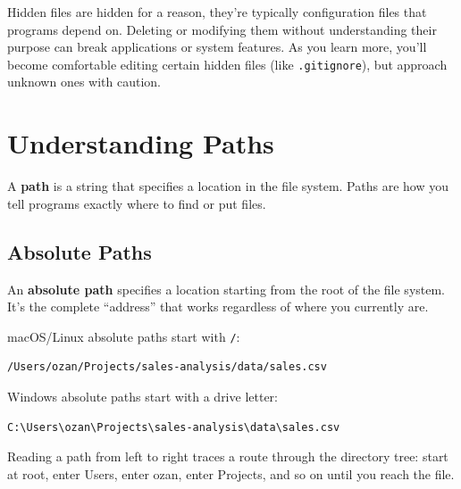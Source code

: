 \documentclass[
  letterpaper,
  DIV=11,
  numbers=noendperiod]{scrreprt}
\begin{document}
\begin{tcolorbox}[enhanced jigsaw, opacitybacktitle=0.6, arc=.35mm, colback=white, bottomtitle=1mm, opacityback=0, toprule=.15mm, left=2mm, colbacktitle=quarto-callout-warning-color!10!white, breakable, coltitle=black, toptitle=1mm, colframe=quarto-callout-warning-color-frame, bottomrule=.15mm, titlerule=0mm, title=\textcolor{quarto-callout-warning-color}{\faExclamationTriangle}\hspace{0.5em}{Don't Modify Hidden Files Carelessly}, rightrule=.15mm, leftrule=.75mm]

Hidden files are hidden for a reason, they're typically configuration
files that programs depend on. Deleting or modifying them without
understanding their purpose can break applications or system features.
As you learn more, you'll become comfortable editing certain hidden
files (like \texttt{.gitignore}), but approach unknown ones with
caution.

\end{tcolorbox}

\section{Understanding Paths}\label{understanding-paths}

A \textbf{path} is a string that specifies a location in the file
system. Paths are how you tell programs exactly where to find or put
files.

\subsection{Absolute Paths}\label{absolute-paths}

An \textbf{absolute path} specifies a location starting from the root of
the file system. It's the complete ``address'' that works regardless of
where you currently are.

macOS/Linux absolute paths start with \texttt{/}:

\begin{verbatim}
/Users/ozan/Projects/sales-analysis/data/sales.csv
\end{verbatim}

Windows absolute paths start with a drive letter:

\begin{verbatim}
C:\Users\ozan\Projects\sales-analysis\data\sales.csv
\end{verbatim}

Reading a path from left to right traces a route through the directory
tree: start at root, enter Users, enter ozan, enter Projects, and so on
until you reach the file.
\end{document}
